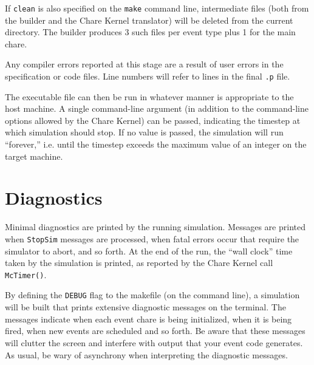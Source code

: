 If {\tt clean} is also specified on the {\tt make} command line,
intermediate files (both from the builder and the Chare Kernel
translator) will be deleted from the current directory.  The builder
produces 3 such files per event type plus 1 for the main chare.

Any compiler errors reported at this stage are a result of user errors
in the specification or code files.  Line numbers will refer to lines in
the final {\tt .p} file.

The executable file can then be run in whatever manner is appropriate to
the host machine.  A single command-line argument (in addition to the
command-line options allowed by the Chare Kernel) can be passed,
indicating the timestep at which simulation should stop.  If no value is
passed, the simulation will run ``forever,'' i.e. until the timestep
exceeds the maximum value of an integer on the target machine.

\section{Diagnostics}

Minimal diagnostics are printed by the running simulation.  Messages are
printed when {\tt StopSim} messages are processed, when fatal errors
occur that require the simulator to abort, and so forth.  At the end of
the run, the ``wall clock'' time taken by the simulation is printed, as
reported by the Chare Kernel call {\tt McTimer()}.

By defining the {\tt DEBUG} flag to the makefile (on the command line),
a simulation will be built that prints extensive diagnostic messages on
the terminal.  The messages indicate when each event chare is being
initialized, when it is being fired, when new events are scheduled and
so forth.  Be aware that these messages will clutter the screen and
interfere with output that your event code generates.  As usual, be wary
of asynchrony when interpreting the diagnostic messages.

